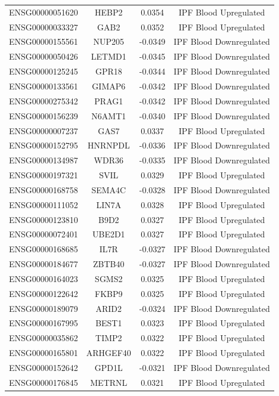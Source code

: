 \documentclass[
]{article}
\begin{document}
\begin{singlespace}
\begin{longtable}[t]{lccc}
ENSG00000051620 & HEBP2 & 0.0354 & IPF Blood Upregulated\\
\addlinespace
ENSG00000033327 & GAB2 & 0.0352 & IPF Blood Upregulated\\
ENSG00000155561 & NUP205 & -0.0349 & IPF Blood Downregulated\\
ENSG00000050426 & LETMD1 & -0.0345 & IPF Blood Downregulated\\
ENSG00000125245 & GPR18 & -0.0344 & IPF Blood Downregulated\\
ENSG00000133561 & GIMAP6 & -0.0342 & IPF Blood Downregulated\\
\addlinespace
ENSG00000275342 & PRAG1 & -0.0342 & IPF Blood Downregulated\\
ENSG00000156239 & N6AMT1 & -0.0340 & IPF Blood Downregulated\\
ENSG00000007237 & GAS7 & 0.0337 & IPF Blood Upregulated\\
ENSG00000152795 & HNRNPDL & -0.0336 & IPF Blood Downregulated\\
ENSG00000134987 & WDR36 & -0.0335 & IPF Blood Downregulated\\
\addlinespace
ENSG00000197321 & SVIL & 0.0329 & IPF Blood Upregulated\\
ENSG00000168758 & SEMA4C & -0.0328 & IPF Blood Downregulated\\
ENSG00000111052 & LIN7A & 0.0328 & IPF Blood Upregulated\\
ENSG00000123810 & B9D2 & 0.0327 & IPF Blood Upregulated\\
ENSG00000072401 & UBE2D1 & 0.0327 & IPF Blood Upregulated\\
\addlinespace
ENSG00000168685 & IL7R & -0.0327 & IPF Blood Downregulated\\
ENSG00000184677 & ZBTB40 & -0.0327 & IPF Blood Downregulated\\
ENSG00000164023 & SGMS2 & 0.0325 & IPF Blood Upregulated\\
ENSG00000122642 & FKBP9 & 0.0325 & IPF Blood Upregulated\\
ENSG00000189079 & ARID2 & -0.0324 & IPF Blood Downregulated\\
\addlinespace
ENSG00000167995 & BEST1 & 0.0323 & IPF Blood Upregulated\\
ENSG00000035862 & TIMP2 & 0.0322 & IPF Blood Upregulated\\
ENSG00000165801 & ARHGEF40 & 0.0322 & IPF Blood Upregulated\\
ENSG00000152642 & GPD1L & -0.0321 & IPF Blood Downregulated\\
ENSG00000176845 & METRNL & 0.0321 & IPF Blood Upregulated\\

\end{longtable}
\end{singlespace}
\end{document}
